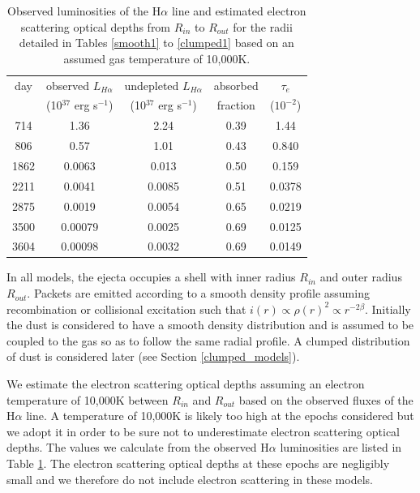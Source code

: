 \documentclass[useAMS,usenatbib,usegraphicx]{mnras}
\begin{document}
\begin{table}
\caption{Observed luminosities of the H$\alpha$ line and estimated electron scattering optical depths from $R_{in}$ to $R_{out}$ for the radii detailed in Tables \ref{smooth1} to \ref{clumped1} based on an assumed gas temperature of 10,000K.}
\begin{center}
\begin{tabular}{@{}ccccc@{}}
\hline
day & observed $L_{H\alpha}$ & undepleted $L_{H\alpha}$ & absorbed  & $\tau_e$ \\
& (10$^{37}$ erg s$^{-1}$) & (10$^{37}$ erg s$^{-1}$) & fraction & ($10^{-2}$) \\
\hline
714 & 1.36 & 2.24 &0.39& 1.44  \\
806 & 0.57 & 1.01 &0.43& 0.840 \\
1862 & 0.0063 & 0.013 &0.50& 0.159  \\
2211 & 0.0041 &0.0085 &0.51& 0.0378  \\
2875 & 0.0019 & 0.0054& 0.65 &0.0219  \\
3500 & 0.00079 & 0.0025 & 0.69&0.0125  \\
3604 & 0.00098 & 0.0032 &0.69&0.0149  \\

\hline
\end{tabular}
\end{center}
\label{tau_e}
\end{table}%



In all models, the ejecta occupies a shell with inner radius $R_{in}$ and 
outer radius $R_{out}$.  Packets are emitted according to a smooth density 
profile assuming recombination or collisional excitation such that $i(r) \propto \rho(r)^2 \propto 
r^{-2\beta}$.  Initially the dust is considered to have a smooth density 
distribution and is assumed to be coupled to the gas so as to follow the same 
radial profile.  A clumped distribution of dust is considered later (see 
Section \ref{clumped_models}).  

We estimate the electron scattering optical depths assuming an electron temperature of 10,000K between $R_{in}$ and $R_{out}$ based on the observed fluxes of the H$\alpha$ line.  A temperature of 10,000K is likely too high at the epochs considered but we adopt it in order to be sure not to underestimate electron scattering optical depths.  The values we calculate from the observed H$\alpha$ luminosities are listed in Table \ref{tau_e}.  The  electron scattering optical depths at these epochs are negligibly small and we therefore do not include electron scattering in 
these models.
\end{document}
